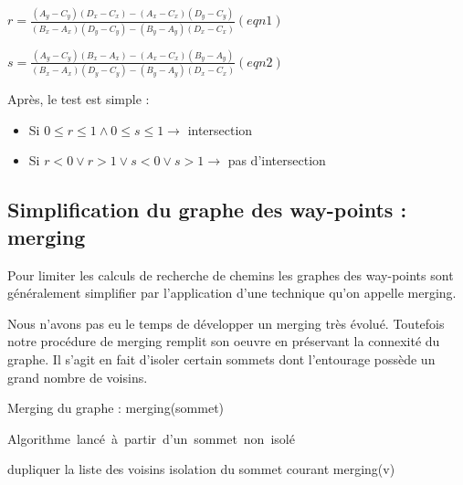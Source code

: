 \documentclass[a4paper,12pt]{report}
\begin{document}
$r = \frac{(A_{y}-C_{y})(D_{x}-C_{x})-(A_{x}-C_{x})(D_{y}-C_{y})}{(B_{x}-A_{x})(D_{y}-C_{y})-(B_{y}-A_{y})(D_{x}-C_{x})} (eqn 1)$

$s = \frac{(A_{y}-C_{y})(B_{x}-A_{x})-(A_{x}-C_{x})(B_{y}-A_{y})}{(B_{x}-A_{x})(D_{y}-C_{y})-(B_{y}-A_{y})(D_{x}-C_{x})} (eqn 2)$

Après, le test est simple : 
\begin{itemize}
 \item Si $0\le r \le 1 \wedge 0 \le s \le 1 \rightarrow$ intersection
 \item Si $r<0 \vee r>1 \vee s<0 \vee s>1 \rightarrow$ pas d'intersection
\end{itemize}

\subsection{Simplification du graphe des way-points : merging}

Pour limiter les calculs de recherche de chemins les graphes des way-points sont généralement simplifier par l'application d'une technique qu'on appelle merging. 

Nous n'avons pas eu le temps de développer un merging très évolué. Toutefois notre procédure de merging remplit son oeuvre en préservant la connexité du graphe. Il s'agit en fait d'isoler certain sommets dont l'entourage possède un grand nombre de voisins. 

\begin{algorithm}[h]
\caption{Merging du graphe : merging(sommet)}
\label{merging_graphe}
\mbox{Algorithme lancé à partir d'un sommet non isolé}
\begin{algorithmic}[1]
  \STATE dupliquer la liste des voisins
      \STATE isolation du sommet courant
    \ENDIF
  \ENDIF
    \STATE merging(v)
  \ENDFOR
\ENDIF
\end{algorithmic}
\end{algorithm}
\end{document}
